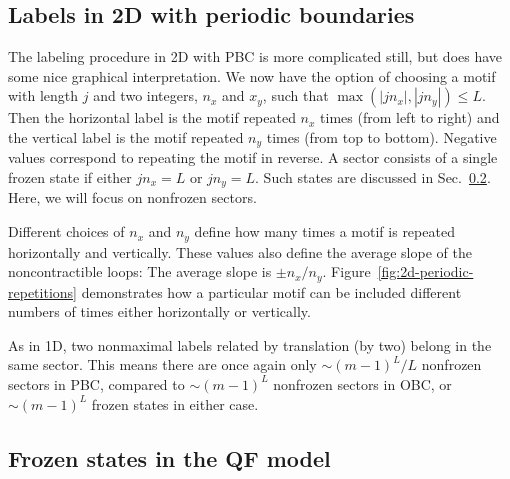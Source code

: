 \subsection{Labels in 2D with periodic boundaries}

The labeling procedure in 2D with PBC is more complicated still, but does have some nice graphical interpretation. We now have the option of choosing a motif with length $j$ and two integers, $n_x$ and $x_y$, such that $\max (|jn_x|, |jn_y|) \le L$. Then the horizontal label is the motif repeated $n_x$ times (from left to right) and the vertical label is the motif repeated $n_y$ times (from top to bottom). Negative values correspond to repeating the motif in reverse. A sector consists of a single frozen state if either $jn_x = L$ or $jn_y = L$. Such states are discussed in Sec.~\ref{sub:frozen-labels}. Here, we will focus on nonfrozen sectors. 

Different choices of $n_x$ and $n_y$ define how many times a motif is repeated horizontally and vertically. These values also define the average slope of the noncontractible loops: The average slope is $\pm n_x/n_y$. Figure~\ref{fig:2d-periodic-repetitions} demonstrates how a particular motif can be included different numbers of times either horizontally or vertically.

As in 1D, two nonmaximal labels related by translation (by two) belong in the same sector. This means there are once again only $\sim (m-1)^L/L$ nonfrozen sectors in PBC, compared to $\sim (m-1)^L$ nonfrozen sectors in OBC, or $\sim (m-1)^L$ frozen states in either case.


\subsection{Frozen states in the QF model} \label{sub:frozen-labels}

